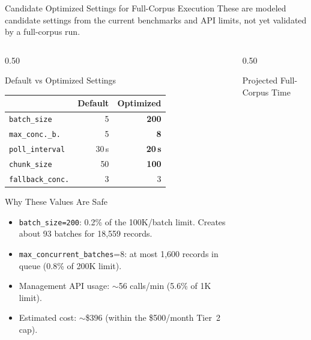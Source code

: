 \documentclass[
        11pt,
        compress,
        xcolor={dvipsnames}
    ]{beamer}
\begin{document}
\begin{frame}[shrink=6]{Candidate Optimized Settings for Full-Corpus Execution}
  \scriptsize
  These are modeled candidate settings from the current benchmarks and API limits, not yet validated by a full-corpus run.
  \begin{columns}[T]
    \begin{column}{0.50\textwidth}
      \begin{block}{Default vs Optimized Settings}
        \scriptsize
        \begin{tabular}{lrr}
          & \textbf{Default} & \textbf{Optimized} \\
          \midrule
          \texttt{batch\_size}      & 5       & \textbf{200} \\
          \texttt{max\_conc.\_b.}  & 5       & \textbf{8}   \\
          \texttt{poll\_interval}   & 30\,s   & \textbf{20\,s} \\
          \texttt{chunk\_size}      & 50      & \textbf{100} \\
          \texttt{fallback\_conc.}  & 3       & 3 \\
        \end{tabular}
      \end{block}
      \vspace{0.2em}
      \begin{block}{Why These Values Are Safe}
        \scriptsize
        \begin{itemize}\setlength{\itemsep}{0.2em}
          \item \texttt{batch\_size=200}: 0.2\% of the 100K/batch limit.
            Creates about 93 batches for 18,559 records.
          \item \texttt{max\_concurrent\_batches}=8: at most 1,600 records in
            queue (0.8\% of 200K limit).
          \item Management API usage: $\sim$56 calls/min
            (5.6\% of 1K limit).
          \item Estimated cost: $\sim$\$396
            (within the \$500/month Tier~2 cap).
        \end{itemize}
      \end{block}
    \end{column}
    \begin{column}{0.50\textwidth}
      \begin{block}{Projected Full-Corpus Time}
        \centering
        \scriptsize
        \vspace{0.3em}

\end{block}
\end{column}
\end{columns}
\end{frame}
\end{document}
